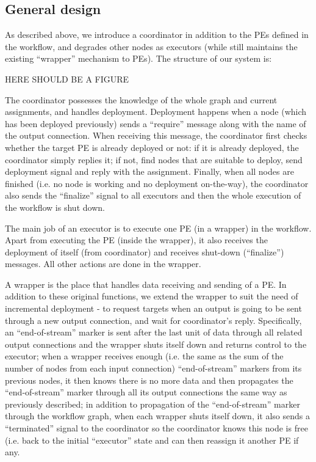 \documentclass[•]{article}
\begin{document}
	\subsection{General design}	
	As described above, we introduce a coordinator in addition to the PEs defined in the workflow, and degrades other nodes as executors (while still maintains the existing ``wrapper'' mechanism to PEs). The structure of our system is:

	HERE SHOULD BE A FIGURE
	
	The coordinator possesses the knowledge of the whole graph and current assignments, and handles deployment. Deployment happens when a node (which has been deployed previously) sends a ``require'' message along with the name of the output connection. When receiving this message, the coordinator first checks whether the target PE is already deployed or not: if it is already deployed, the coordinator simply replies it; if not, find nodes that are suitable to deploy, send deployment signal and reply with the assignment. Finally, when all nodes are finished (i.e. no node is working and no deployment on-the-way), the coordinator also sends the ``finalize'' signal to all executors and then the whole execution of the workflow is shut down.
	 
	The main job of an executor is to execute one PE (in a wrapper) in the workflow. Apart from executing the PE (inside the wrapper), it also receives the deployment of itself (from coordinator) and receives shut-down (``finalize'') messages. All other actions are done in the wrapper.
	
	A wrapper is the place that handles data receiving and sending of a PE. In addition to these original functions, we extend the wrapper to suit the need of incremental deployment - to request targets when an output is going to be sent through a new output connection, and wait for coordinator's reply. Specifically, an ``end-of-stream'' marker is sent after the last unit of data through all related output connections and the wrapper shuts itself down and returns control to the executor; when a wrapper receives enough (i.e. the same as the sum of the number of nodes from each input connection) ``end-of-stream'' markers from its previous nodes, it then knows there is no more data and then propagates the ``end-of-stream'' marker through all its output connections the same way as previously described; in addition to propagation of the ``end-of-stream'' marker through the workflow graph, when each wrapper shuts itself down, it also sends a ``terminated'' signal to the coordinator so the coordinator knows this node is free (i.e. back to the initial ``executor'' state and can then reassign it another PE if any.
	
\end{document}
